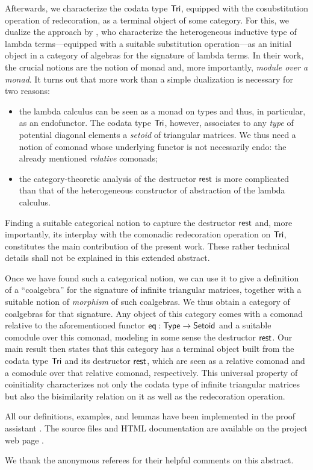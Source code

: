 \documentclass{easychair}
\begin{document}
 Afterwards, we characterize the codata type $\mathsf{Tri}$, equipped with the cosubstitution operation of redecoration, as a terminal object of some category.
 For this, we dualize the approach by \textcite{DBLP:journals/iandc/HirschowitzM10},
 who characterize the heterogeneous inductive type of lambda terms---equipped with a suitable substitution operation---as an initial object in
 a category of algebras for the signature of lambda terms.
 In their work, the crucial notions are the notion of monad and, more importantly, \emph{module over a monad}.
 It turns out that more work than a simple dualization is necessary for two reasons:
 \begin{itemize}
  \item the lambda calculus can be seen as a monad on types and thus, in particular, as an endofunctor.
        The codata type $\mathsf{Tri}$, however, associates to any \emph{type} of potential diagonal elements a \emph{setoid}
        of triangular matrices. We thus need a notion of comonad whose underlying functor is not necessarily endo: the 
        already mentioned \emph{relative} comonads;
  \item the category-theoretic analysis of the destructor $\mathsf{rest}$ is more complicated than that of the heterogeneous 
           constructor of abstraction of the lambda calculus.
 \end{itemize}
 Finding a suitable categorical notion to capture the destructor $\mathsf{rest}$ and, more importantly, its interplay with
 the comonadic redecoration operation on $\mathsf{Tri}$, constitutes the main contribution of the present work.
 These rather technical details shall not be explained in this extended abstract.
 
 



  Once we have found such a categorical notion, we can use 
  it to give a definition of a \enquote{coalgebra} for the signature of infinite triangular matrices, 
  together with a suitable notion of \emph{morphism} of such coalgebras.
   We thus obtain a category of coalgebras for that signature.
  Any object of this category comes with a comonad relative to the aforementioned functor $\mathsf{eq} : \mathsf{Type}\to\mathsf{Setoid}$
  and a suitable comodule over this comonad, modeling in some sense the destructor $\mathsf{rest}$.
  Our main result then states that this category 
  has a terminal object built from the codata type $\mathsf{Tri}$ and its destructor $\mathsf{rest}$,
  which are seen as a relative comonad and a comodule over that relative comonad, respectively.
  This universal property of coinitiality characterizes not only the codata type of infinite triangular matrices but also
  the bisimilarity relation on it as well as the redecoration operation.
 
 All our definitions, examples, and lemmas have been implemented in the proof assistant \coq. %
 The \coq source files and HTML documentation are available on the project web page \parencite{trimat_coq}.


 
We thank the anonymous referees for their helpful comments on this abstract.

\renewcommand*{\bibfont}{\small}
\printbibliography[heading=none]
\end{document}
